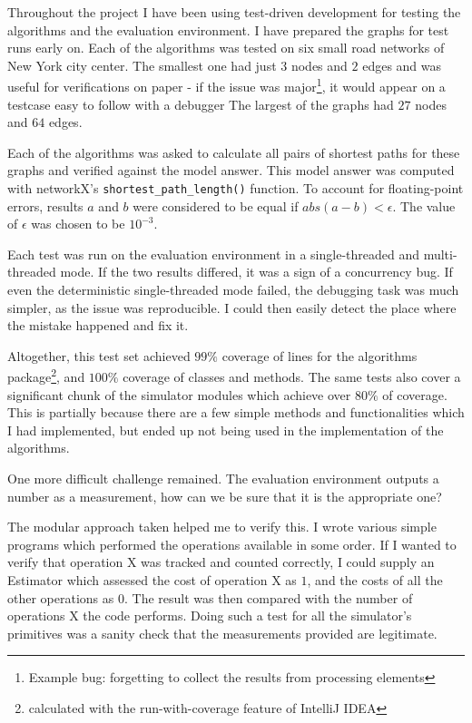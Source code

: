 \documentclass[12pt,a4paper,oneside,openright]{report}
\begin{document}
Throughout the project I have been using test-driven development for testing the algorithms and the evaluation environment. I have prepared the graphs for test runs early on. Each of the algorithms was tested on six small road networks of New York city center. The smallest one had just $3$ nodes and $2$ edges and was useful for verifications on paper - if the issue was major\footnote{Example bug: forgetting to collect the results from processing elements}, it would appear on a testcase easy to follow with a debugger The largest of the graphs had $27$ nodes and $64$ edges.

Each of the algorithms was asked to calculate all pairs of shortest paths for these graphs and verified against the model answer. This model answer was computed with networkX's \texttt{shortest\_path\_length()} function. To account for floating-point errors, results $a$ and $b$ were considered to be equal if $abs(a-b) < \epsilon$. The value of $\epsilon$ was chosen to be $10^{-3}$.

Each test was run on the evaluation environment in a single-threaded and multi-threaded mode. If the two results differed, it was a sign of a concurrency bug. If even the deterministic single-threaded mode failed, the debugging task was much simpler, as the issue was reproducible. I could then easily detect the place where the mistake happened and fix it.

Altogether, this test set achieved $99\%$ coverage of lines for the algorithms package\footnote{calculated with the run-with-coverage feature of IntelliJ IDEA}, and $100\%$ coverage of classes and methods. The same tests also cover a significant chunk of the simulator modules which achieve over $80\%$ of coverage. This is partially because there are a few simple methods and functionalities which I had implemented, but ended up not being used in the implementation of the algorithms.

One more difficult challenge remained. The evaluation environment outputs a number as a measurement, how can we be sure that it is the appropriate one? 

The modular approach taken helped me to verify this. I wrote various simple programs which performed the operations available in some order. If I wanted to verify that operation X was tracked and counted correctly, I could supply an Estimator which assessed the cost of operation X as $1$, and the costs of all the other operations as $0$. The result was then compared with the number of operations X the code performs. Doing such a test for all the simulator's primitives was a sanity check that the measurements provided are legitimate.
\end{document}
